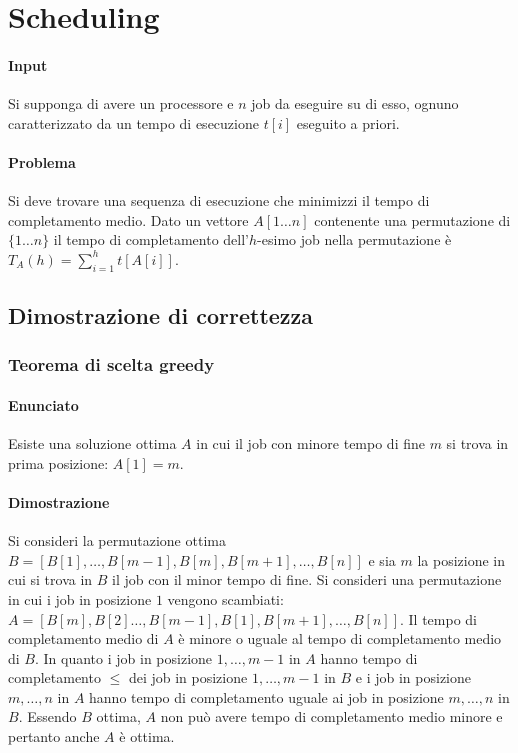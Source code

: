 \section{Scheduling}
\paragraph{Input}
Si supponga di avere un processore e $n$ job da eseguire su di esso, ognuno caratterizzato da un tempo di esecuzione $t[i]$ eseguito a priori.
\paragraph{Problema}
Si deve trovare una sequenza di esecuzione che minimizzi il tempo di completamento medio. Dato un vettore $A[1\dots n]$ contenente una permutazione di $\{1\dots n\}$ il tempo di 
completamento dell'$h$-esimo job nella permutazione \`e $T_A(h) = \sum\limits_{i = 1}^h t[A[i]]$. 
\subsection{Dimostrazione di correttezza}
\subsubsection{Teorema di scelta greedy}
\paragraph{Enunciato}
Esiste una soluzione ottima $A$ in cui il job con minore tempo di fine $m$ si trova in prima posizione: $A[1] = m$.
\paragraph{Dimostrazione}
Si consideri la permutazione ottima $B = [B[1], \dots, B[m-1], B[m], B[m+1], \dots, B[n]]$ e sia $m$ la posizione in cui si trova in $B$ il job con il minor tempo di fine. Si consideri
una permutazione in cui i job in posizione $1$ vengono scambiati: $A =[B[m], B[2] \dots, B[m-1], B[1], B[m+1], \dots, B[n]]$. Il tempo di completamento medio di $A$ \`e minore o uguale
al tempo di completamento medio di $B$. In quanto i job in posizione $1, \dots, m-1$ in $A$ hanno tempo di completamento $\le$ dei job in posizione $1, \dots, m-1$ in $B$ e i job in
posizione $m, \dots, n$ in $A$ hanno tempo di completamento uguale ai job in posizione $m, \dots, n$ in $B$. Essendo $B$ ottima, $A$ non pu\`o avere tempo di completamento medio minore
e pertanto anche $A$ \`e ottima. 

